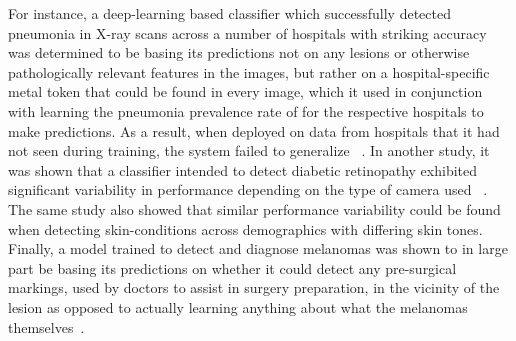 	For instance, a deep-learning based classifier which successfully detected pneumonia in X-ray scans across a number of hospitals with striking accuracy was determined to be basing its predictions not on any lesions or otherwise pathologically relevant features in the images, but rather on a hospital-specific metal token that could be found in every image, which it used in conjunction with learning the pneumonia prevalence rate of for the respective hospitals to make predictions. As a result, when deployed on data from hospitals that it had not seen during training, the system failed to generalize ~\cite{pneumonia}. In another study, it was shown that a classifier intended to detect diabetic retinopathy exhibited significant variability in performance depending on the type of camera used ~\cite{damour2020underspecification}. The same study also showed that similar performance variability could be found when detecting skin-conditions across demographics with differing skin tones. Finally, a model trained to detect and diagnose melanomas  was shown to in large part be basing its predictions on whether it could detect any pre-surgical markings, used by doctors to assist in surgery preparation, in the vicinity of the lesion as opposed to actually learning anything about what the melanomas themselves~\cite{skin_shortcut}.  
	 
